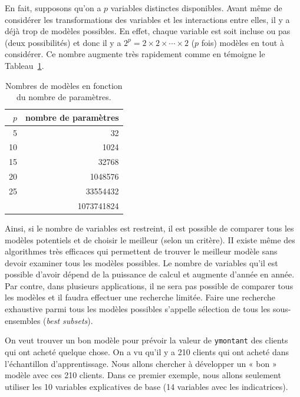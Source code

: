 \documentclass[
  11pt,
  letterpaper,
]{scrbook}
\theoremstyle{definition}
\theoremstyle{remark}
\begin{document}
En fait, supposons qu'on a \(p\) variables distinctes disponibles. Avant
même de considérer les transformations des variables et les interactions
entre elles, il y a déjà trop de modèles possibles. En effet, chaque
variable est soit incluse ou pas (deux possibilités) et donc il y a
\(2^p=2\times 2 \times \cdots \times 2\) (\(p\) fois) modèles en tout à
considérer. Ce nombre augmente très rapidement comme en témoigne le
Tableau~\ref{tbl-02-table3}.

\hypertarget{tbl-02-table3}{}
\begin{table}
\caption{\label{tbl-02-table3}Nombres de modèles en fonction du nombre de paramètres. }\tabularnewline

\centering
\begin{tabular}{rr}
\toprule
\(p\) & nombre de paramètres\\
\midrule
5 & 32\\
10 & 1024\\
15 & 32768\\
20 & 1048576\\
25 & 33554432\\
\addlinespace
30 & 1073741824\\
\bottomrule
\end{tabular}
\end{table}

Ainsi, si le nombre de variables est restreint, il est possible de
comparer tous les modèles potentiels et de choisir le meilleur (selon un
critère). II existe même des algorithmes très efficaces qui permettent
de trouver le meilleur modèle sans devoir examiner tous les modèles
possibles. Le nombre de variables qu'il est possible d'avoir dépend de
la puissance de calcul et augmente d'année en année. Par contre, dans
plusieurs applications, il ne sera pas possible de comparer tous les
modèles et il faudra effectuer une recherche limitée. Faire une
recherche exhaustive parmi tous les modèles possibles s'appelle
sélection de tous les sous-ensembles (\emph{best subsets}).

On veut trouver un bon modèle pour prévoir la valeur de
\texttt{ymontant} des clients qui ont acheté quelque chose. On a vu
qu'il y a 210 clients qui ont acheté dans l'échantillon d'apprentissage.
Nous allons chercher à développer un « bon » modèle avec ces 210
clients. Dans ce premier exemple, nous allons seulement utiliser les 10
variables explicatives de base (14 variables avec les indicatrices).
\end{document}
